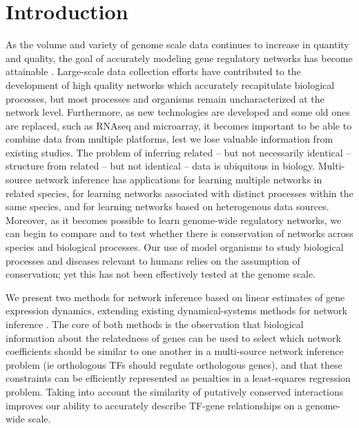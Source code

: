 \documentclass[11pt]{article}
\begin{document}
\section{Introduction}
As the volume and variety of genome scale data continues to increase in quantity and quality, the goal of accurately modeling gene regulatory networks has become attainable \cite{bonneau_predictive_2007, ciofani_validated_2012, carro_transcriptional_2010}. Large-scale data collection efforts have contributed to the development of high quality networks which accurately recapitulate biological processes, but most processes and organisms remain uncharacterized at the network level. Furthermore, as new technologies are developed and some old ones are replaced, such as RNAseq and microarray, it becomes important to be able to combine data from multiple platforms, lest we lose valuable information from existing studies. The problem of inferring related -- but not necessarily identical -- structure from related -- but not identical -- data is ubiquitous in biology. Multi-source network inference has applications for learning multiple networks in related species, for learning networks associated with distinct processes within the same species, and for learning networks based on heterogenous data sources. Moreover, as it becomes possible to learn genome-wide regulatory networks, we can begin to compare and to test whether there is conservation of networks across species and biological processes. Our use of model organisms to study biological processes and diseases relevant to humans relies on the assumption of conservation; yet this has not been effectively tested at the genome scale. 

We present two methods for network inference based on linear estimates of gene expression dynamics, extending existing dynamical-systems methods for network inference \cite{bonneau_predictive_2007, arrieta-ortiz_experimentally_2015}. The core of both methods is the observation that biological information about the relatedness of genes can be used to select which network coefficients should be similar to one another in a multi-source network inference problem (ie orthologous TFs should regulate orthologous genes), and that these constraints can be efficiently represented as penalties in a least-squares regression problem. Taking into account the similarity of putatively conserved interactions improves our ability to accurately describe TF-gene relationships on a genome-wide scale.  
\end{document}
